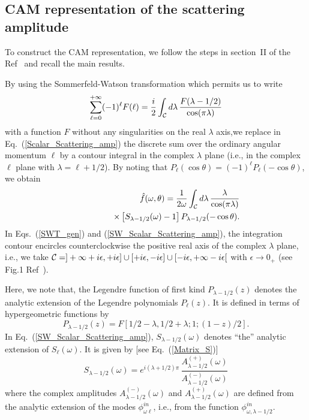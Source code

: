 \documentclass[aps,prd,longbibliography,reprint,twocolumn,amsmath,amssymb,amsfonts,showpacs,superscriptaddress]{revtex4-1}%
\begin{document}
\subsection{CAM representation of the scattering amplitude}
\label{SecIIc}

To construct the CAM representation, we follow the steps in section~II of the Ref~\cite{Folacci:2019cmc} and recall the main results.


By using the Sommerfeld-Watson transformation \cite{Watson18,Sommerfeld49,Newton:1982qc} which permits us to write
\begin{equation}\label{SWT_gen}
\sum_{\ell=0}^{+\infty} (-1)^\ell F(\ell)= \frac{i}{2} \int_{\cal C} d\lambda \, \frac{F(\lambda -1/2)}{\cos (\pi \lambda)}
\end{equation}
with a function $F$ without any singularities on the real $\lambda$ axis,we replace in Eq.~(\ref{Scalar_Scattering_amp}) the discrete sum over the ordinary angular momentum $\ell$ by a contour integral in the complex $\lambda$ plane (i.e., in the complex $\ell$ plane with $\lambda = \ell +1/2$). By noting that $P_\ell (\cos \theta)=(-1)^\ell P_\ell (-\cos \theta)$, we obtain
\begin{eqnarray}\label{SW_Scalar_Scattering_amp}
& & \hat{f}(\omega,\theta) = \frac{1}{2 \omega}  \int_{\cal C} d\lambda \, \frac{\lambda}{\cos (\pi \lambda)} \nonumber \\
&&  \qquad\qquad   \times \left[ S_{\lambda -1/2} (\omega) -1 \right]P_{\lambda -1/2} (-\cos \theta).
\end{eqnarray}
In Eqs.~(\ref{SWT_gen}) and (\ref{SW_Scalar_Scattering_amp}), the integration contour encircles counterclockwise the positive real axis of the complex $\lambda$ plane, i.e., we take ${\cal C}=]+\infty +i\epsilon,+i\epsilon] \cup
[+i\epsilon,-i\epsilon] \cup [-i\epsilon, +\infty -i\epsilon[$ with $\epsilon \to 0_+$ (see Fig.1 Ref~\cite{Folacci:2019cmc}).

Here, we note that, the Legendre function of first kind $P_{\lambda -1/2} (z)$ denotes the analytic extension of the Legendre polynomials $P_\ell (z)$. It is defined in terms of hypergeometric functions by \cite{AS65}
\begin{equation}\label{Def_ext_LegendreP}
P_{\lambda -1/2} (z) = F[1/2-\lambda,1/2+\lambda;1;(1-z)/2].
\end{equation}
In Eq.~(\ref{SW_Scalar_Scattering_amp}), $S_{\lambda -1/2} (\omega)$ denotes ``the'' analytic extension of $S_\ell (\omega)$. It is given by [see Eq.~(\ref{Matrix_S})]
\begin{equation}\label{Matrix_S_CAM}
  S_{\lambda -1/2}(\omega) =  e^{i(\lambda + 1/2)\pi} \, \frac{A_{\lambda -1/2}^{(+)}(\omega)}{A_{\lambda -1/2}^{(-)}(\omega)}
\end{equation}
where the complex amplitudes $A^{(-)}_{\lambda -1/2} (\omega)$ and  $A^{(+)}_{\lambda -1/2} (\omega)$ are defined from the analytic extension of the modes $\phi_{\omega \ell}^{in}$, i.e., from the function $\phi_{\omega ,\lambda -1/2}^{in}$.
\end{document}

